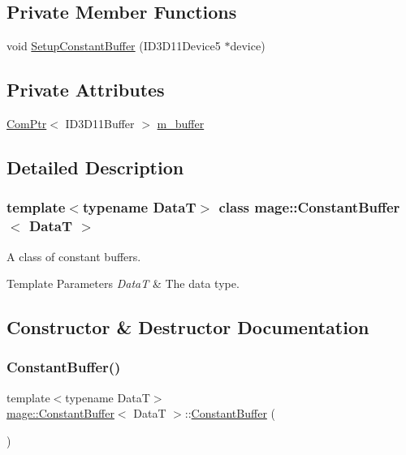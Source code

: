 \subsection*{Private Member Functions}
\begin{DoxyCompactItemize}
\item 
void \hyperlink{classmage_1_1_constant_buffer_a52e82d01bd000ff314c33bfdc350c67e}{Setup\+Constant\+Buffer} (I\+D3\+D11\+Device5 $\ast$device)
\end{DoxyCompactItemize}
\subsection*{Private Attributes}
\begin{DoxyCompactItemize}
\item 
\hyperlink{namespacemage_ae74f374780900893caa5555d1031fd79}{Com\+Ptr}$<$ I\+D3\+D11\+Buffer $>$ \hyperlink{classmage_1_1_constant_buffer_a394571e3102fe053f3357e2e218c0eda}{m\+\_\+buffer}
\end{DoxyCompactItemize}


\subsection{Detailed Description}
\subsubsection*{template$<$typename DataT$>$\newline
class mage\+::\+Constant\+Buffer$<$ Data\+T $>$}

A class of constant buffers.


\begin{DoxyTemplParams}{Template Parameters}
{\em DataT} & The data type. \\
\hline
\end{DoxyTemplParams}


\subsection{Constructor \& Destructor Documentation}
\hypertarget{classmage_1_1_constant_buffer_a3badd88f8570d6622f6eb33c7420a87d}{}\label{classmage_1_1_constant_buffer_a3badd88f8570d6622f6eb33c7420a87d} 
\subsubsection{\texorpdfstring{Constant\+Buffer()}{ConstantBuffer()}\hspace{0.1cm}{\footnotesize\ttfamily [1/4]}}
{\footnotesize\ttfamily template$<$typename DataT$>$ \\
\hyperlink{classmage_1_1_constant_buffer}{mage\+::\+Constant\+Buffer}$<$ DataT $>$\+::\hyperlink{classmage_1_1_constant_buffer}{Constant\+Buffer} (\begin{DoxyParamCaption}{ }\end{DoxyParamCaption})}

